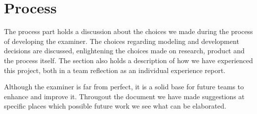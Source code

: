 



\section{Process}

The process part holds a discussion about the choices we made
during the process of developing the \gls{examiner}. The choices regarding 
modeling and development decisions are discussed, enlightening the choices made
on research, product and the process itself. The section also holds a description of how we have experienced this project, both in a team reflection
as an individual experience report.



Although the \gls{examiner} is far from perfect, it is a solid base for future
teams to enhance and improve it.
Througout the document we have made suggestions at specific places which possible
future work we see what can be elaborated.